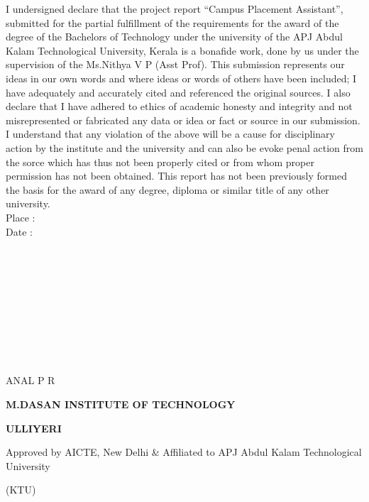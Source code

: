 \documentclass[12pt]{article}
\begin{document}
\begin{changemargin}{0.5cm}{0.5cm}
I undersigned declare that the project report “Campus Placement Assistant”, submitted for the partial fulfillment of the requirements for
the award of the degree of the Bachelors of Technology under the university of
the APJ Abdul Kalam Technological University, Kerala is a bonafide work,
done by us under the supervision of the Ms.Nithya V P (Asst Prof). This
submission represents our ideas in our own words and where ideas or words
of others have been included; I have adequately and accurately cited and
referenced the original sources. I also declare that I have adhered to ethics
of academic honesty and integrity and not misrepresented or fabricated any
data or idea or fact or source in our submission. I understand that any
violation of the above will be a cause for disciplinary action by the
institute and the university and can also be evoke penal action from the sorce
which has thus not been properly cited or from whom proper permission has
not been obtained. This report has not been previously formed the basis for
the award of any degree, diploma or similar title of any other university.
\\Place :
\\Date :
\\
\\
\\
\\
\\
\\
\\
\\
\\
\\
 \begin{center}{ANAL P R}\end{center}

\thispagestyle{empty}

\newpage
\vspace*{1px}
\begin{center}\large\bf{M.DASAN INSTITUTE OF TECHNOLOGY}\end{center}
\begin{center}\large\bf{ULLIYERI} \end{center}
\begin{center}Approved by AICTE, New Delhi \& Affiliated to APJ Abdul Kalam Technological University\end{center}
\begin{center}(KTU)\end{center}


\end{changemargin}
\end{document}
